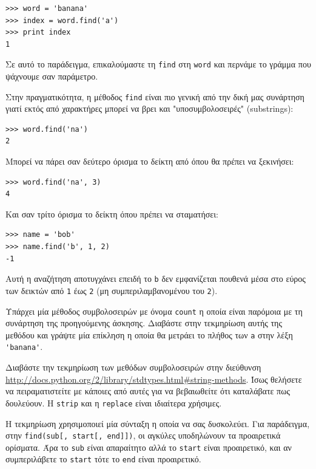 \documentclass[10pt]{book}
\begin{document}
\begin{verbatim}
>>> word = 'banana'
>>> index = word.find('a')
>>> print index
1
\end{verbatim}
%

Σε αυτό το παράδειγμα, επικαλούμαστε τη {\tt find} στη {\tt word} 
και περνάμε το γράμμα που ψάχνουμε σαν παράμετρο.

Στην πραγματικότητα, η μέθοδος {\tt find} είναι πιο γενική από την δική μας συνάρτηση γιατί εκτός από χαρακτήρες μπορεί να βρει και "υποσυμβολοσειρές" (substrings):

\begin{verbatim}
>>> word.find('na')
2
\end{verbatim}
%

Μπορεί να πάρει σαν δεύτερο όρισμα το δείκτη από όπου θα πρέπει να ξεκινήσει:

\begin{verbatim}
>>> word.find('na', 3)
4
\end{verbatim}
%

Και σαν τρίτο όρισμα το δείκτη όπου πρέπει να σταματήσει:

\begin{verbatim}
>>> name = 'bob'
>>> name.find('b', 1, 2)
-1
\end{verbatim}
%

Αυτή η αναζήτηση αποτυγχάνει επειδή το {\tt b} δεν εμφανίζεται πουθενά μέσα στο
εύρος των δεικτών από {\tt 1} έως {\tt 2} (μη συμπεριλαμβανομένου του {\tt 2}).
\\

\begin{exercise}

Υπάρχει μία μέθοδος συμβολοσειρών με όνομα {\tt count} η οποία είναι παρόμοια
με τη συνάρτηση της προηγούμενης άσκησης. Διαβάστε στην τεκμηρίωση αυτής της μεθόδου και γράψτε μία επίκληση η οποία θα μετράει το πλήθος των {\tt a} στην λέξη \verb"'banana'".
\\
\end{exercise}

\begin{exercise}

Διαβάστε την τεκμηρίωση των μεθόδων συμβολοσειρών στην διεύθυνση 
\url{http://docs.python.org/2/library/stdtypes.html#string-methods}. 
Ίσως θελήσετε να πειραματιστείτε με κάποιες από αυτές για να βεβαιωθείτε ότι
καταλάβατε πως δουλεύουν. Η {\tt strip} και η {\tt replace} είναι
ιδιαίτερα χρήσιμες.

Η τεκμηρίωση χρησιμοποιεί μία σύνταξη η οποία να σας δυσκολεύει. Για παράδειγμα, στην \verb"find(sub[, start[, end]])", οι αγκύλες υποδηλώνουν τα προαιρετικά ορίσματα. Άρα το {\tt sub} είναι απαραίτητο αλλά το {\tt start} είναι προαιρετικό, και αν συμπεριλάβετε το {\tt start} τότε το {\tt end} είναι προαιρετικό. 
\end{exercise}
\end{document}
